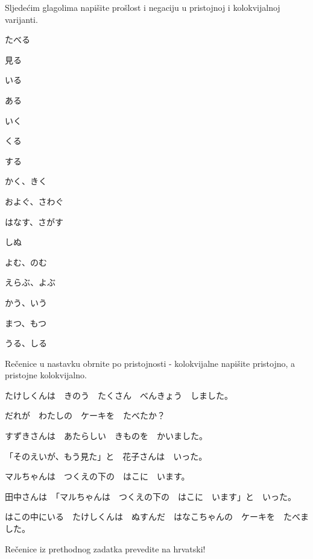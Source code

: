 
\author{Tomislav Mamić}

	
	\begin{mondai}{Sljedećim glagolima napišite prošlost i negaciju u pristojnoj i kolokvijalnoj varijanti.}
		\item たべる
		\item 見る
		\item いる
		\vspace{5pt}
		\item ある
		\item いく
		\item くる
		\item する
		\vspace{5pt}
		\item かく、きく
		\item およぐ、さわぐ
		\item はなす、さがす
		\vspace{5pt}
		\item しぬ
		\item よむ、のむ
		\item えらぶ、よぶ
		\vspace{5pt}
		\item かう、いう
		\item まつ、もつ
		\item うる、しる
	\end{mondai}

	\begin{mondai}{Rečenice u nastavku obrnite po pristojnosti - kolokvijalne napišite pristojno, a pristojne kolokvijalno.}
		\item たけしくんは　きのう　たくさん　べんきょう　しました。
		\item だれが　わたしの　ケーキを　たべたか？
		\item すずきさんは　あたらしい　きものを　かいました。
		\item 「そのえいが、もう見た」と　花子さんは　いった。
		\item マルちゃんは　つくえの下の　はこに　います。
		\item 田中さんは　「マルちゃんは　つくえの下の　はこに　います」と　いった。
		\item *はこの中にいる　たけしくんは　ぬすんだ　はなこちゃんの　ケーキを　たべました。
	\end{mondai}

	\noindent Rečenice iz prethodnog zadatka prevedite na hrvatski!
